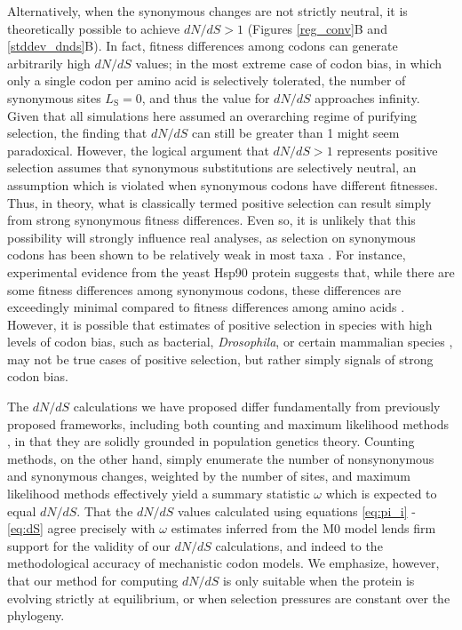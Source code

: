 \documentclass{pnastwo}
\begin{document}
\begin{article}
Alternatively, when the synonymous changes are not strictly neutral, it is theoretically possible to achieve $dN/dS > 1$ (Figures \ref{reg_conv}B and \ref{stddev_dnds}B). In fact, fitness differences among codons can generate arbitrarily high $dN/dS$ values; in the most extreme case of codon bias, in which only a single codon per amino acid is selectively tolerated, the number of synonymous sites $L_\text{S} = 0$, and thus the value for $dN/dS$ approaches infinity. Given that all simulations here assumed an overarching regime of purifying selection, the finding that $dN/dS$ can still be greater than 1 might seem paradoxical. However, the logical argument that $dN/dS > 1$ represents positive selection assumes that synonymous substitutions are selectively neutral, an assumption which is violated when synonymous codons have different fitnesses. Thus, in theory, what is classically termed positive selection can result simply from strong synonymous fitness differences. Even so, it is unlikely that this possibility will strongly influence real analyses, as selection on synonymous codons has been shown to be relatively weak in most taxa \cite{HershbergPetrov2008}. For instance, experimental evidence from the yeast Hsp90 protein suggests that, while there are some fitness differences among synonymous codons, these differences are exceedingly minimal compared to fitness differences among amino acids \cite{Hietpas2011,Hietpas2013}. However, it is possible that estimates of positive selection in species with high levels of codon bias, such as bacterial, \textit{Drosophila}, or certain mammalian species \cite{Duret2002, Chamaryetal2006, PlotkinKudla2010}, may not be true cases of positive selection, but rather simply signals of strong codon bias.

The $dN/dS$ calculations we have proposed differ fundamentally from previously proposed frameworks, including both counting \cite{LWL85,NG86,Pamilo1993,Ina1995,YN00} and maximum likelihood methods \cite{GoldmanYang1994,MuseGaut1994,Yang2006,Anisimova2009}, in that they are solidly grounded in population genetics theory. Counting methods, on the other hand, simply enumerate the number of nonsynonymous and synonymous changes, weighted by the number of sites, and maximum likelihood methods effectively yield a summary statistic $\omega$ which is expected to equal $dN/dS$. That the $dN/dS$ values calculated using equations \eqref{eq:pi_i} - \eqref{eq:dS} agree precisely with $\omega$ estimates inferred from the M0 model lends firm support for the validity of our $dN/dS$ calculations, and indeed to the methodological accuracy of mechanistic codon models. We emphasize, however, that our method for computing $dN/dS$ is only suitable when the protein is evolving strictly at equilibrium, or when selection pressures are constant over the phylogeny.
 

\end{article}
\end{document}

